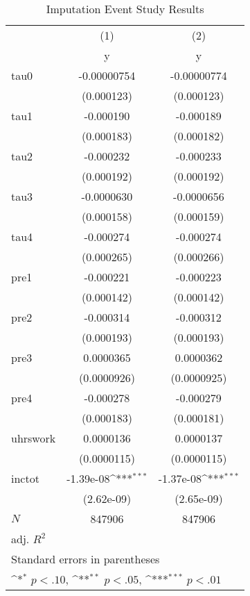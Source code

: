 \begin{table}[htbp]\centering
\def\sym#1{\ifmmode^{#1}\else\(^{#1}\)\fi}
\caption{Imputation Event Study Results}
\begin{tabular}{l*{2}{c}}
\hline\hline
            &\multicolumn{1}{c}{(1)}&\multicolumn{1}{c}{(2)}\\
            &\multicolumn{1}{c}{y}&\multicolumn{1}{c}{y}\\
\hline
tau0        & -0.00000754         & -0.00000774         \\
            &  (0.000123)         &  (0.000123)         \\
[1em]
tau1        &   -0.000190         &   -0.000189         \\
            &  (0.000183)         &  (0.000182)         \\
[1em]
tau2        &   -0.000232         &   -0.000233         \\
            &  (0.000192)         &  (0.000192)         \\
[1em]
tau3        &  -0.0000630         &  -0.0000656         \\
            &  (0.000158)         &  (0.000159)         \\
[1em]
tau4        &   -0.000274         &   -0.000274         \\
            &  (0.000265)         &  (0.000266)         \\
[1em]
pre1        &   -0.000221         &   -0.000223         \\
            &  (0.000142)         &  (0.000142)         \\
[1em]
pre2        &   -0.000314         &   -0.000312         \\
            &  (0.000193)         &  (0.000193)         \\
[1em]
pre3        &   0.0000365         &   0.0000362         \\
            & (0.0000926)         & (0.0000925)         \\
[1em]
pre4        &   -0.000278         &   -0.000279         \\
            &  (0.000183)         &  (0.000181)         \\
[1em]
uhrswork    &   0.0000136         &   0.0000137         \\
            & (0.0000115)         & (0.0000115)         \\
[1em]
inctot      &   -1.39e-08\sym{***}&   -1.37e-08\sym{***}\\
            &  (2.62e-09)         &  (2.65e-09)         \\
\hline
\(N\)       &      847906         &      847906         \\
adj. \(R^{2}\)&                     &                     \\
\hline\hline
\multicolumn{3}{l}{\footnotesize Standard errors in parentheses}\\
\multicolumn{3}{l}{\footnotesize \sym{*} \(p<.10\), \sym{**} \(p<.05\), \sym{***} \(p<.01\)}\\
\end{tabular}
\end{table}
